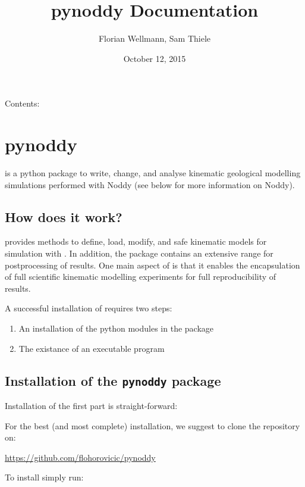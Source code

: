 \documentclass[a4paper,10pt,english]{sphinxmanual}
\title{pynoddy Documentation}
\date{October 12, 2015}
\author{Florian Wellmann, Sam Thiele}
\begin{document}
\maketitle
\tableofcontents
{}\label{index::doc}


Contents:


\chapter{pynoddy}
\label{readme:welcome-to-pynoddy-s-documentation}\label{readme::doc}\label{readme:pynoddy}
 is a python package to write, change, and analyse kinematic
geological modelling simulations performed with Noddy (see below for
more information on Noddy).


\section{How does it work?}
\label{readme:how-does-it-work}
 provides methods to define, load, modify, and safe kinematic
models for simulation with . In addition, the package contains
an extensive range for postprocessing of results. One main aspect of
 is that it enables the encapsulation of full scientific
kinematic modelling experiments for full reproducibility of results.

A successful installation of  requires two steps:
\begin{enumerate}
\item {} 
An installation of the python modules in the package 

\item {} 
The existance of an executable  program

\end{enumerate}


\section{Installation of the \texttt{pynoddy} package}
\label{readme:installation-of-the-pynoddy-package}
Installation of the first part is straight-forward:

For the best (and most complete) installation, we suggest to clone the
 repository on:

\href{https://github.com/flohorovicic/pynoddy}{https://github.com/flohorovicic/pynoddy}

To install  simply run:
\end{document}
